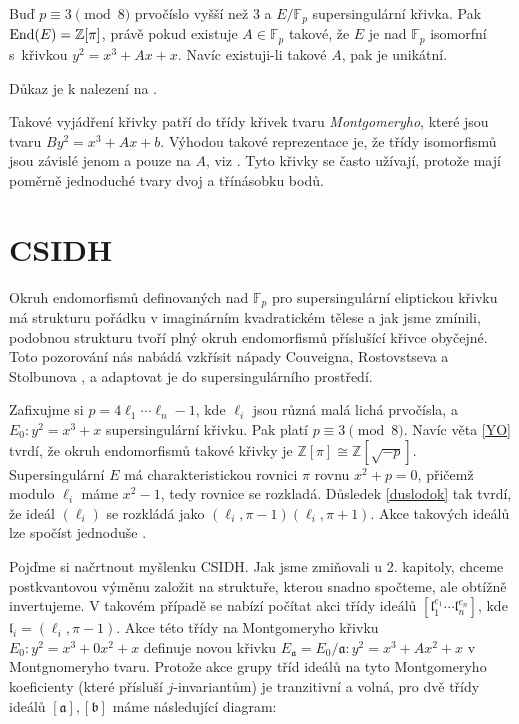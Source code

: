 \documentclass[12pt]{report}
\begin{document}
\begin{veta}\label{YO}
Buď $p \equiv 3 \pmod{8}$ prvočíslo vyšší než $3$ a $E/\mathbb{F}_p$ supersingulární křivka. Pak $\operatorname{End}(E) = \mathbb{Z}[\pi]$, právě pokud existuje $A \in \mathbb{F}_p$ takové, že $E$ je nad $\mathbb{F}_p$ isomorfní s~křivkou $y^2 = x^3 + Ax + x$. Navíc existuji-li takové $A$, pak je unikátní.
\end{veta}
Důkaz je k nalezení na \cite[Prop. 8.]{CSIDH}.

Takové vyjádření křivky patří do třídy křivek tvaru \textit{Montgomeryho}, které jsou tvaru $B y^2 = x^3 + Ax + b$. Výhodou takové reprezentace je, že třídy isomorfismů jsou závislé jenom a pouze na $A$, viz \cite[Lemma 29.]{Karaskova}. Tyto křivky se často užívají, protože mají poměrně jednoduché tvary dvoj a třínásobku bodů.

\section{CSIDH}

Okruh endomorfismů definovaných nad $\mathbb{F}_p$ pro supersingulární eliptickou křivku má strukturu pořádku v imaginárním kvadratickém tělese a jak jsme zmínili, podobnou strukturu tvoří plný okruh endomorfismů příslušící křivce obyčejné. Toto pozorování nás nabádá vzkřísit nápady Couveigna, Rostovstseva a Stolbunova \cite{Couveignes}, \cite{Stolbunov} a adaptovat je do supersingulárního prostředí.

Zafixujme si $p = 4 \ell_1 \cdots \ell_n - 1$, kde $\ell_i$ jsou různá malá lichá prvočísla, a $E_0 : y^2 = x^3 + x$ supersingulární křivku. Pak platí $p \equiv 3 \pmod{8}$. Navíc věta \ref{YO} tvrdí, že okruh endomorfismů takové křivky je $\mathbb{Z}[\pi] \cong \mathbb{Z}[\sqrt{-p}]$. Supersingulární $E$ má charakteristickou rovnici $\pi$ rovnu $x^2 + p = 0$, přičemž modulo $\ell_i$ máme $x^2 - 1$, tedy rovnice se rozkladá. Důsledek \ref{duslodok} tak tvrdí, že ideál $(\ell_i)$ se rozkládá jako $(\ell_i,\pi - 1)(\ell_i, \pi + 1)$. Akce takových ideálů lze spočíst jednoduše \cite{CSIDH}.

Pojďme si načrtnout myšlenku CSIDH. Jak jsme zmiňovali u 2. kapitoly, chceme postkvantovou výměnu založit na struktuře, kterou snadno spočteme, ale obtížně invertujeme. V takovém případě se nabízí počítat akci třídy ideálů $[\mathfrak{l}_1 ^{e_1} \cdots \mathfrak{l}_n ^{e_n}]$, kde $\mathfrak{l}_i = (\ell_i,\pi - 1)$. Akce této třídy na Montgomeryho křivku $E_0 : y^2 = x^3 + 0x^2 + x$ definuje novou křivku $E_{\mathfrak{a}} =E_0 /\mathfrak{a} : y^2 = x^3 + Ax^2 + x$ v Montgnomeryho tvaru. Protože akce grupy tříd ideálů na tyto Montgomeryho koeficienty (které přísluší $j$-invariantům) je tranzitivní a volná, pro dvě třídy ideálů $[\mathfrak{a}], [\mathfrak{b}]$ máme následující diagram: 
\end{document}
